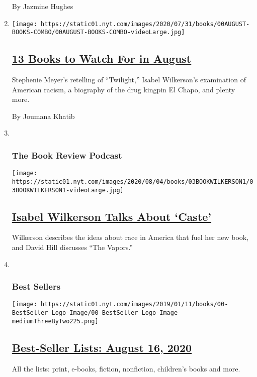 \begin{enumerate}
  By Jazmine Hughes
\item
  \texttt{[image: https://static01.nyt.com/images/2020/07/31/books/00AUGUST-BOOKS-COMBO/00AUGUST-BOOKS-COMBO-videoLarge.jpg]}

  \hypertarget{13-books-to-watch-for-in-august}{%
  \subsection{\texorpdfstring{\href{/2020/07/30/books/new-august-books.html}{13
  Books to Watch For in
  August}}{13 Books to Watch For in August}}\label{13-books-to-watch-for-in-august}}

  Stephenie Meyer's retelling of ``Twilight,'' Isabel Wilkerson's
  examination of American racism, a biography of the drug kingpin El
  Chapo, and plenty more.

  By Joumana Khatib
\item ~
  \hypertarget{the-book-review-podcast}{%
  \subsubsection{The Book Review
  Podcast}\label{the-book-review-podcast}}

  \texttt{[image: https://static01.nyt.com/images/2020/08/04/books/03BOOKWILKERSON1/03BOOKWILKERSON1-videoLarge.jpg]}

  \hypertarget{isabel-wilkerson-talks-about-caste}{%
  \subsection{\texorpdfstring{\href{/2020/08/07/books/review/podcast-isabel-wilkerson-caste-david-hill-vapors.html}{Isabel
  Wilkerson Talks About
  `Caste'}}{Isabel Wilkerson Talks About `Caste'}}\label{isabel-wilkerson-talks-about-caste}}

  Wilkerson describes the ideas about race in America that fuel her new
  book, and David Hill discusses ``The Vapors.''
\item ~
  \hypertarget{best-sellers}{%
  \subsubsection{Best Sellers}\label{best-sellers}}

  \texttt{[image: https://static01.nyt.com/images/2019/01/11/books/00-BestSeller-Logo-Image/00-BestSeller-Logo-Image-mediumThreeByTwo225.png]}

  \hypertarget{best-seller-lists-august-16-2020}{%
  \subsection{\texorpdfstring{\href{/interactive/2020/01/29/books/review/best-sellers-promo-for-front-copy2.html}{Best-Seller
  Lists: August 16,
  2020}}{Best-Seller Lists: August 16, 2020}}\label{best-seller-lists-august-16-2020}}

  All the lists: print, e-books, fiction, nonfiction, children's books
  and more.
\end{enumerate}

